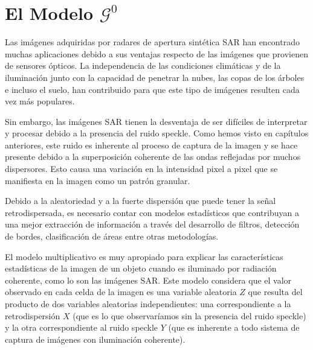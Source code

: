 
\chapter{El Modelo $\mathcal{G}^0$}
\label{modeloG0}

Las imágenes adquiridas por radares de apertura sintética SAR han encontrado muchas aplicaciones debido a sus ventajas respecto de las imágenes que provienen de sensores ópticos. La independencia de las condiciones climáticas y de la iluminación junto con la capacidad de penetrar la nubes, las copas de los árboles e incluso el suelo, han contribuido para que este tipo de imágenes resulten cada vez más populares.

Sin embargo, las imágenes SAR tienen la desventaja de ser difíciles de interpretar y procesar debido a la presencia del ruido speckle. Como hemos visto en capítulos anteriores, este ruido es inherente al proceso de captura de la imagen y se hace presente debido a la superposición coherente de las ondas reflejadas por muchos dispersores. Esto causa una variación en la intensidad pixel a pixel que se manifiesta en la imagen como un patrón granular. 

Debido a la aleatoriedad y a la fuerte dispersión que puede tener la señal retrodispersada, es necesario contar con modelos estadísticos que contribuyan a una mejor extracción de información a través del desarrollo de filtros, detección de bordes, clasificación de áreas entre otras metodologías. 

El modelo multiplicativo es muy apropiado para explicar las características estadísticas de la imagen de un objeto cuando es iluminado por radiación coherente, como lo son las imágenes SAR.
Este modelo considera que el valor observado en cada celda de la imagen es una variable aleatoria $Z$ que resulta del producto de dos variables aleatorias independientes: una correspondiente a la retrodispersión $X$ (que es lo que observaríamos sin la presencia del ruido speckle) y la otra correspondiente al ruido speckle $Y$ (que es inherente a todo sistema de captura de imágenes con iluminación coherente).

